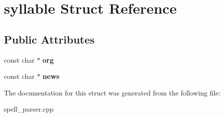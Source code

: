 \hypertarget{structsyllable}{}\section{syllable Struct Reference}
\label{structsyllable}
\subsection*{Public Attributes}
\begin{DoxyCompactItemize}
\item 
\mbox{\label{structsyllable_aed0922013965550127b135189e9182f4}} 
const char $\ast$ {\bfseries org}
\item 
\mbox{\label{structsyllable_a4045ef02461a883866bfaef3240eb809}} 
const char $\ast$ {\bfseries news}
\end{DoxyCompactItemize}


The documentation for this struct was generated from the following file\+:\begin{DoxyCompactItemize}
\item 
spell\+\_\+parser.\+cpp\end{DoxyCompactItemize}
